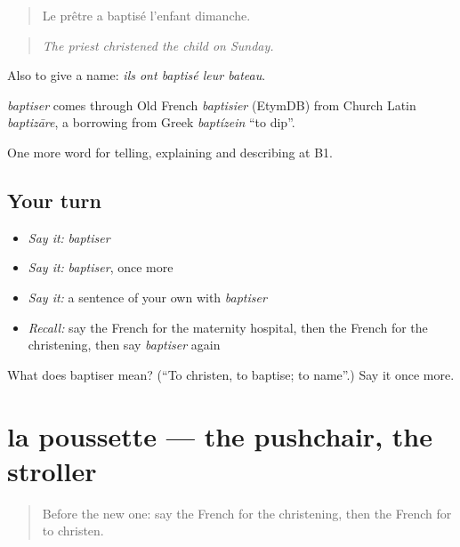 \begin{quote}
Le prêtre a baptisé l'enfant dimanche.
\end{quote}

\begin{quote}
\emph{The priest christened the child on Sunday.}
\end{quote}

Also to give a name: \emph{ils ont baptisé leur bateau}.

\begin{cousinweb}
\emph{baptiser} comes through Old French \emph{baptisier} (EtymDB) from Church Latin \emph{baptizāre}, a borrowing from Greek \emph{baptízein} \textquotedblleft{}to dip\textquotedblright{}.
\end{cousinweb}

\begin{grammarlens}[title={What you've built}]
One more word for telling, explaining and describing at B1.
\end{grammarlens}

\subsection*{Your turn}
\begin{itemize}
\raggedright
  \item \emph{Say it:} \emph{baptiser}
  \item \emph{Say it:} \emph{baptiser}, once more
  \item \emph{Say it:} a sentence of your own with \emph{baptiser}
  \item \emph{Recall:} say the French for the maternity hospital, then the French for the christening, then say \emph{baptiser} again
\end{itemize}

\begin{tcolorbox}[breakable,colback=teal!4,colframe=teal!35!black,title={Before you move on}]
What does baptiser mean? (\textquotedblleft{}To christen, to baptise; to name\textquotedblright{}.) Say it once more.
\end{tcolorbox}
\section[la poussette]{la poussette — the pushchair, the stroller}

\label{lesson:FR-C309-poussette}



\begin{quote}
Before the new one: say the French for the christening, then the French for to christen.
\end{quote}

